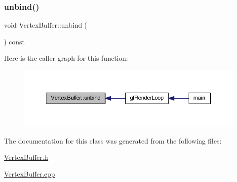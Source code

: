 \subsubsection{\texorpdfstring{unbind()}{unbind()}}
{\footnotesize\ttfamily void Vertex\+Buffer\+::unbind (\begin{DoxyParamCaption}{ }\end{DoxyParamCaption}) const}

Here is the caller graph for this function\+:
\nopagebreak
\begin{figure}[H]
\begin{center}
\leavevmode
\includegraphics[width=350pt]{class_vertex_buffer_a85fad27f8f068b0610ff052a2a5496f1_icgraph}
\end{center}
\end{figure}


The documentation for this class was generated from the following files\+:\begin{DoxyCompactItemize}
\item 
\mbox{\hyperlink{_vertex_buffer_8h}{Vertex\+Buffer.\+h}}\item 
\mbox{\hyperlink{_vertex_buffer_8cpp}{Vertex\+Buffer.\+cpp}}\end{DoxyCompactItemize}
